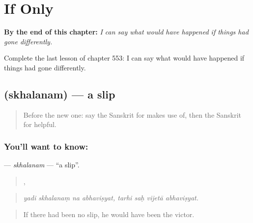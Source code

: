 
\chapter{If Only}
\label{ch:sa-if-only}

\begin{chapteropening}
\textbf{By the end of this chapter:} \emph{I can say what would have happened if things had gone differently.}

Complete the last lesson of chapter 553: I can say what would have happened if things had gone differently.
\end{chapteropening}

\section[\texorpdfstring{\sk{स्खलनम्} (skhalanam)}{स्खलनम् (skhalanam)}]{ (skhalanam) — a slip}

\label{lesson:SA-C553-skhalanam}



\begin{quote}
Before the new one: say the Sanskrit for makes use of, then the Sanskrit for helpful.
\end{quote}

\subsection*{You'll want to know: }
\textbf{} — \emph{skhalanam} — \textquotedblleft{}a slip\textquotedblright{}.

\begin{quote}
   ,    
\end{quote}

\begin{quote}
\emph{yadi skhalanaṃ na abhaviṣyat, tarhi saḥ vijetā abhaviṣyat.}
\end{quote}

\begin{quote}
If there had been no slip, he would have been the victor.
\end{quote}

